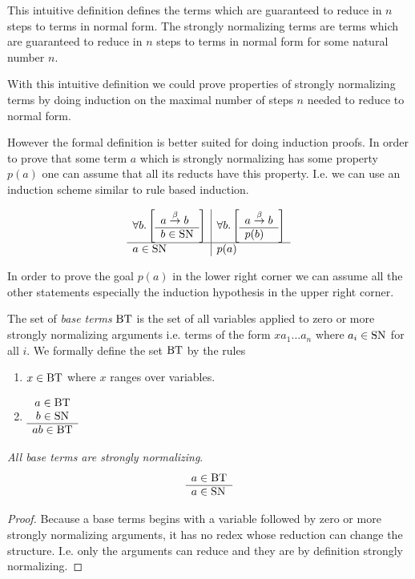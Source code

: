 This intuitive definition defines the terms which are guaranteed to reduce in
$n$ steps to terms in normal form. The strongly normalizing terms are terms
which are guaranteed to reduce in $n$ steps to terms in normal form for some
natural number $n$.

With this intuitive definition we could prove properties of strongly normalizing
terms by doing induction on the maximal number of steps $n$ needed to reduce to
normal form.


However the formal definition is better suited for doing induction proofs. In
order to prove that some term $a$ which is strongly normalizing has some
property $p(a)$ one can assume that all its reducts have this property. I.e. we
can use an induction scheme similar to rule based induction.

$$
    \begin{array}{l|l}
        \forall b. \left[ \begin{array}{l} a \stackrel{\beta}{\to} b \\ \hline b \in \text{SN}\end{array} \right]
        &
        \forall b. \left[ \begin{array}{l} a \stackrel{\beta}{\to} b \\ \hline p(b)\end{array} \right]
        \\
        \hline
        a \in \text{SN}
        &
        p(a)
    \end{array}
$$

In order to prove the goal $p(a)$ in the lower right corner we can assume all
the other statements especially the induction hypothesis in the upper right
corner.




\begin{definition}
    The set of \emph{base terms} $\text{BT}$ is the set of all variables applied to
    zero or more strongly normalizing arguments i.e. terms of the form $x a_1
    \ldots a_n$ where $a_i \in \text{SN}$ for all $i$. We formally define the set
    $\text{BT}$ by the rules
    \begin{enumerate}
    \item $x \in \text{BT}$ where $x$ ranges over variables.

    \item
        $\begin{array}{c} 
            a \in \text{BT}
            \\
            b \in \text{SN}
         \\ \hline 
            ab \in \text{BT}
        \end{array}$
    \end{enumerate}
\end{definition}

\begin{theorem}
    \label{BaseTermsStronglyNormalizing}
    \emph{All base terms are strongly normalizing}.
    $$
    \begin{array}{l} 
        a \in \text{BT}
     \\ \hline 
        a \in \text{SN}
    \end{array}
    $$
    \begin{proof}
        Because a base terms begins with a variable followed by zero or more
        strongly normalizing arguments, it has no redex whose reduction can
        change the structure. I.e. only the arguments can reduce and they are by
        definition strongly normalizing.
    \end{proof}
\end{theorem}



